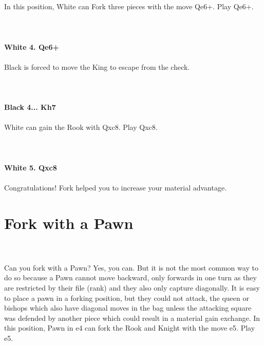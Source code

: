 \documentclass{article}
\begin{document}

\\
\\
In this position, White can Fork three pieces with the move Qe6+. Play Qe6+.\\
\\

\\
\\
\textbf{White 4. Qe6+}\\
\\
Black is forced to move the King to escape from the check.\\
\\

\\
\\
\textbf{Black 4... Kh7}\\
\\
White can gain the Rook with Qxc8. Play Qxc8.\\
\\

\\
\\
\textbf{White 5. Qxc8}\\
\\
Congratulations! Fork helped you to increase your material advantage.\section{ Fork with a Pawn}

\\
\\
Can you fork with a Pawn? Yes, you can. But it is not the most common way to do so because a Pawn cannot move backward, only forwards in one turn as they are restricted by their file (rank) and they also only capture diagonally. It is easy to place a pawn in a forking position, but they could not attack, the queen or bishops which also have diagonal moves in the bag unless the attacking square was defended by another piece which could result in a material gain exchange. In this position, Pawn in e4 can fork the Rook and Knight with the move e5. Play e5.\\
\\

\\
\\
\end{document}
